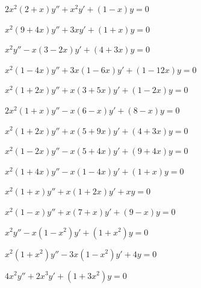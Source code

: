 \begin{exerciselist}
  \item\label{exer:7.6.17} $2x^{2}(2+x)y''+x^{2}y'+(1-x)y=0$

  \item\label{exer:7.6.18} $x^{2}(9+4x)y''+3xy'+(1+x)y=0$

  \item\label{exer:7.6.19} $x^{2}y''-x(3-2x)y'+(4+3x)y=0$

  \item\label{exer:7.6.20} $x^{2}(1-4x)y''+3x(1-6x)y'+(1-12x)y=0$

  \item\label{exer:7.6.21} $x^{2}(1+2x)y''+x(3+5x)y'+(1-2x)y=0$

  \item\label{exer:7.6.22} $2x^{2}(1+x)y''-x(6-x)y'+(8-x)y=0$


  \item\label{exer:7.6.23} \Cex $x^{2}(1+2x)y''+x(5+9x)y'+(4+3x)y=0$

  \item\label{exer:7.6.24} \Cex $x^{2}(1-2x)y''-x(5+4x)y'+(9+4x)y=0$

  \item\label{exer:7.6.25} \Cex $x^{2}(1+4x)y''-x(1-4x)y'+(1+x)y=0$

  \item\label{exer:7.6.26} \Cex $x^{2}(1+x)y''+x(1+2x)y'+xy=0$

  \item\label{exer:7.6.27} \Cex $x^{2}(1-x)y''+x(7+x)y'+(9-x)y=0$


  \item\label{exer:7.6.28} $x^{2}y''-x(1-x^{2})y'+(1+x^{2})y=0$

  \item\label{exer:7.6.29} $x^{2}(1+x^{2})y''-3x(1-x^{2})y'+4y=0$

  \item\label{exer:7.6.30} $4x^{2}y''+2x^{3}y'+(1+3x^{2})y=0$


\end{exerciselist}
